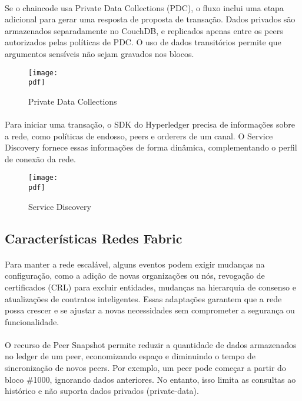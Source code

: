 \documentclass[letterpaper,11pt,leqno]{article}
\newcommand{\pdf}{figures/figures}
\begin{document}
\paragraph{}
Se o chaincode usa Private Data Collections (PDC), o fluxo inclui uma etapa
adicional para gerar uma resposta de proposta de transação. Dados privados são
armazenados separadamente no CouchDB, e replicados apenas entre os peers
autorizados pelas políticas de PDC. O uso de dados transitórios permite que
argumentos sensíveis não sejam gravados nos blocos.

\begin{figure}[H]
	{\texttt{[image: \\pdf]}}
	\caption{Private Data Collections}
	\label{f:figure3}\end{figure}

\newpage
\paragraph{}
Para iniciar uma transação, o SDK do Hyperledger precisa de informações sobre a
rede, como políticas de endosso, peers e orderers de um canal. O Service
Discovery fornece essas informações de forma dinâmica, complementando o perfil
de conexão da rede.

\begin{figure}[H]
	{\texttt{[image: \\pdf]}}
	\caption{Service Discovery}
	\label{f:figure4}\end{figure}

\subsection{Características Redes Fabric}

\paragraph{}
Para manter a rede escalável, alguns eventos podem exigir mudanças na
configuração, como a adição de novas organizações ou nós, revogação de
certificados (CRL) para excluir entidades, mudanças na hierarquia de consenso e
atualizações de contratos inteligentes. Essas adaptações garantem que a rede
possa crescer e se ajustar a novas necessidades sem comprometer a segurança ou
funcionalidade.

\paragraph{}
O recurso de Peer Snapshot permite reduzir a quantidade de dados armazenados no
ledger de um peer, economizando espaço e diminuindo o tempo de sincronização de
novos peers. Por exemplo, um peer pode começar a partir do bloco \#1000,
ignorando dados anteriores. No entanto, isso limita as consultas ao histórico e
não suporta dados privados (private-data).
\end{document}
